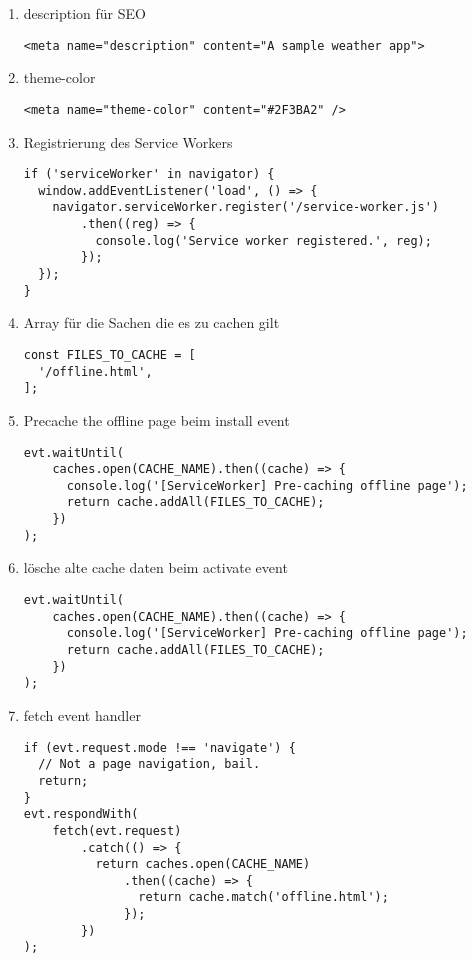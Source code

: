 \documentclass[oneside]{book}%
\begin{document}
\begin{appendix}
\begin{enumerate}
\item description für SEO
\begin{lstlisting}
<meta name="description" content="A sample weather app">
\end{lstlisting}

\item theme-color
\begin{lstlisting}
<meta name="theme-color" content="#2F3BA2" />
\end{lstlisting}

\item Registrierung des Service Workers
\begin{lstlisting}
if ('serviceWorker' in navigator) {
  window.addEventListener('load', () => {
    navigator.serviceWorker.register('/service-worker.js')
        .then((reg) => {
          console.log('Service worker registered.', reg);
        });
  });
}
\end{lstlisting}


\item Array für die Sachen die es zu cachen gilt
\begin{lstlisting}
const FILES_TO_CACHE = [
  '/offline.html',
];
\end{lstlisting}

\item Precache the offline page beim install event
\begin{lstlisting}
evt.waitUntil(
    caches.open(CACHE_NAME).then((cache) => {
      console.log('[ServiceWorker] Pre-caching offline page');
      return cache.addAll(FILES_TO_CACHE);
    })
);
\end{lstlisting}

\item lösche alte cache daten beim activate event
\begin{lstlisting}
evt.waitUntil(
    caches.open(CACHE_NAME).then((cache) => {
      console.log('[ServiceWorker] Pre-caching offline page');
      return cache.addAll(FILES_TO_CACHE);
    })
);
\end{lstlisting}

\item fetch event handler
\begin{lstlisting}
if (evt.request.mode !== 'navigate') {
  // Not a page navigation, bail.
  return;
}
evt.respondWith(
    fetch(evt.request)
        .catch(() => {
          return caches.open(CACHE_NAME)
              .then((cache) => {
                return cache.match('offline.html');
              });
        })
);
\end{lstlisting}


\end{enumerate}
\end{appendix}
\end{document}
